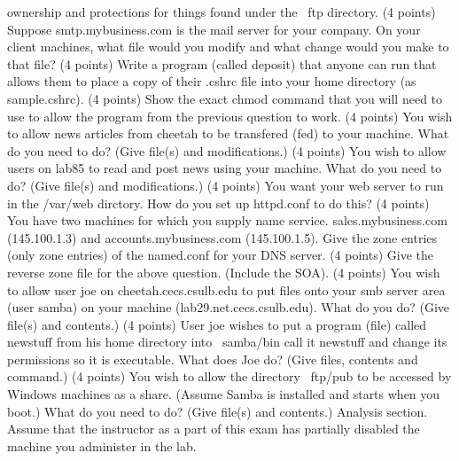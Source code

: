 ownership and protections for things found under the {\ltt{}~ftp}
directory.
\vskip 2.5in
\ques
(4 points)
Suppose {\ltt{}smtp.mybusiness.com} is the mail server for your company.
On your client machines,
what file would you modify and what change would you make to that file?
\vskip 1.0in
\vfill\eject
\ques
(4 points)
Write a program (called {\ltt{}deposit}) that anyone can run that allows 
them to place a copy of their {\ltt{}.cshrc} file into your home directory 
(as {\ltt{}sample.cshrc}).
\vskip 3.5in
\ques
(4 points)
Show the exact {\ltt{}chmod} command
that you will need to use to allow the program from the previous
question to work.
\vskip 0.5in
\ques
(4 points)
You wish to allow news articles from cheetah to be transfered (fed)
to your machine.
What do you need to do? (Give file(s) and modifications.)
\vskip 1.2in
\ques
(4 points)
You wish to allow users on {\ltt{}lab85} to read and post news using
your machine.
What do you need to do?
(Give file(s) and modifications.)
\vskip 1.2in
\ques
(4 points)
You want your web server to run in the {\ltt{}/var/web} dirctory.
How do you set up {\ltt{}httpd.conf} to do this?
\vskip 1.0in
\vfill\eject
\ques
(4 points)
You have two machines for which you supply name service.
{\ltt{}sales.mybusiness.com} (145.100.1.3) and 
{\ltt{}accounts.mybusiness.com} (145.100.1.5).
Give the zone entries (only zone entries) of the {\ltt{}named.conf}
for your DNS server.
\vfill
\ques
(4 points)
Give the reverse zone file for the above question. (Include the SOA).
\vfill
\ques
(4 points)
You wish to allow user {\ltt{}joe} on {\ltt{}cheetah.cecs.csulb.edu}
to put files onto your smb server area (user {\ltt{}samba}) on 
your machine ({\ltt{}lab29.net.cecs.csulb.edu}).
What do you do?
(Give file(s) and contents.)
\vskip 0.6in
\eject
\ques
(4 points)
User {\ltt{}joe} wishes to put a program (file) called 
{\ltt{}newstuff} from his home directory into {\ltt{}~samba/bin}
call it {\ltt{}newstuff} and change  its permissions so
it is executable. 
What does Joe do? (Give files, contents and command.)
\vskip 3.0in
\ques
(4 points)
You wish to allow the directory {\ltt{}~ftp/pub} to be accessed by
Windows machines as a share. (Assume Samba is installed and 
starts when you boot.)
What do you need to do?
(Give file(s) and contents.)
\vskip 2.5in
\vfill\eject
Analysis section. Assume that the instructor as a part of this exam
has partially disabled the machine you administer in the lab.

